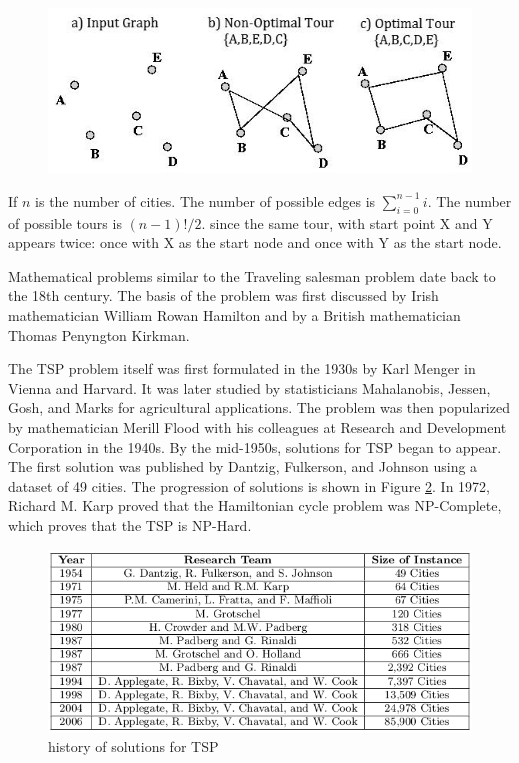 \documentclass[10pt,twocolumn,letterpaper]{article}
\begin{document}
\begin{figure}
\centering
\includegraphics[width=\linewidth]{egtsp}
\caption{}
\label{fig:egtsp}
\end{figure}
If $n$ is the number of cities. The number of possible edges is $\sum_{i=0}^{n-1}i$. The number of possible tours is $(n - 1)!/2$. since the same tour, with start point
X and Y appears twice: once with X as the start node and
once with Y as the start node.

Mathematical problems similar to the Traveling salesman
problem date back to the 18th century. The basis of the
problem was first discussed by Irish mathematician William
Rowan Hamilton and by a British mathematician Thomas
Penyngton Kirkman.

The TSP problem itself was first formulated in the 1930s
by Karl Menger in Vienna and Harvard. It was later studied
by statisticians Mahalanobis, Jessen, Gosh, and Marks for
agricultural applications. The problem was then popularized by mathematician Merill Flood with his colleagues at
Research and Development Corporation in the 1940s. By
the mid-1950s, solutions for TSP began to appear. The first
solution was published by Dantzig, Fulkerson, and Johnson
using a dataset of 49 cities. The progression of solutions is
shown in Figure \ref{fig:hist}. In 1972, Richard M. Karp proved that
the Hamiltonian cycle problem was NP-Complete, which
proves that the TSP is NP-Hard.
\begin{figure}
\centering
\includegraphics[width=.6\linewidth]{hist}
\caption{history of solutions for TSP\cite{haqueempirical}}
\label{fig:hist}
\end{figure}
\end{document}
